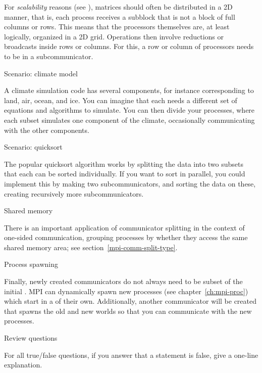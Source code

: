 For \emph{scalability} reasons
(see ),
matrices should often be distributed
in a 2D manner, that is, each process receives a subblock that is not
a block of full columns or rows. This means that the processors themselves
are, at least logically, organized in a 2D grid. Operations
then involve reductions or broadcasts inside rows or columns. For
this, a row or column of processors needs to be in a subcommunicator.

 {Scenario: climate model}

A climate simulation code has several components, for instance corresponding
to land, air, ocean, and ice. You can imagine that each needs a different set
of equations and algorithms to simulate. You can then divide your processes,
where each subset simulates one component of the climate, occasionally communicating
with the other components.

 {Scenario: quicksort}

The popular quicksort algorithm works by splitting the data
into two subsets that each can be sorted individually.
If you want to sort in parallel, you could implement this by making two subcommunicators,
and sorting the data on these, creating recursively more subcommunicators.

 {Shared memory}

There is an important application of communicator splitting in the
context of one-sided communication, grouping processes by whether they
access the same shared memory area; see section~\ref{mpi-comm-split-type}.

 {Process spawning}

Finally, newly created communicators do not always need to be subset
of the initial .
MPI can dynamically spawn new processes (see chapter~\ref{ch:mpi-proc})
which start in a  of their own.
Additionally, another communicator will be created that spawns the old and new worlds
so that you can communicate with the new processes.







\newpage
{} {Review questions}

For all true/false questions, if you answer that a statement is false,
give a one-line explanation.

